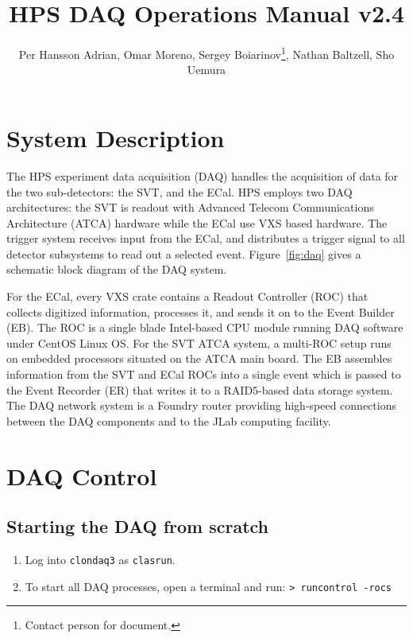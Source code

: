 \documentclass[12pt]{article}
\title{HPS DAQ Operations Manual v2.4}
\author{Per Hansson Adrian, Omar Moreno, Sergey Boiarinov\thanks{Contact person for document.}, Nathan Baltzell, Sho Uemura }
\begin{document}
\maketitle

\tableofcontents

\section{System Description}
The HPS experiment data acquisition (DAQ) handles the acquisition of data for the two sub-detectors: the SVT,  and the ECal. HPS employs two DAQ architectures: the SVT is readout with Advanced Telecom Communications Architecture (ATCA) hardware while the ECal use VXS based hardware. The trigger system receives input from the ECal, and distributes a trigger signal to all detector subsystems to read out a selected event. Figure~\ref{fig:daq} gives a schematic block diagram of the DAQ system.

For the ECal, every VXS crate contains a Readout Controller (ROC) that collects digitized information, processes it, and sends it on to the Event Builder (EB). The ROC is a single blade Intel-based CPU module running DAQ software under CentOS Linux OS. For the SVT ATCA system, a multi-ROC setup runs on embedded processors situated on the ATCA main board. The EB assembles information from the SVT and ECal ROCs into a single event which is passed to the Event Recorder (ER) that writes it to a RAID5-based data storage system. The DAQ network system is a Foundry router providing high-speed connections between the DAQ components and to the JLab computing facility. 

\newpage
\section{DAQ Control}
\label{sec:daq_control}

\subsection{Starting the DAQ from scratch}\label{sec:daqstart}

\begin{enumerate}
\item 
Log into \texttt{clondaq3} as \texttt{clasrun}.
\item 
To start all DAQ processes, open a terminal and run:\newline
\texttt{> runcontrol -rocs}\newline
\end{enumerate}
\end{document}
